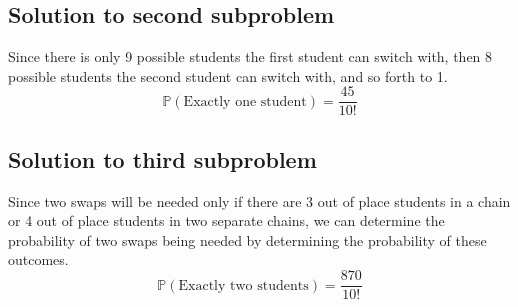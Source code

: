 \documentclass[12pt]{article}
\newcommand{\bbP}{\mathbb{P}}
\renewcommand{\_}[1]{\underline{ #1 }}
\theoremstyle{definition}
\numberwithin{equation}{subsection}
\begin{document}
\subsection*{Solution to second subproblem}
Since there is only 9 possible students the first student can switch with, then 8 possible students the second student can switch with, and so forth to 1.
\[
\bbP(\text{Exactly one student})=\frac{45}{10!}
\]

\subsection*{Solution to third subproblem}
Since two swaps will be needed only if there are 3 out of place students in a chain or 4 out of place students in two separate chains, we can determine the probability of two swaps being needed by determining the probability of these outcomes. \\

\[
\bbP(\text{Exactly two students})=\frac{870}{10!}
\]
\end{document}
